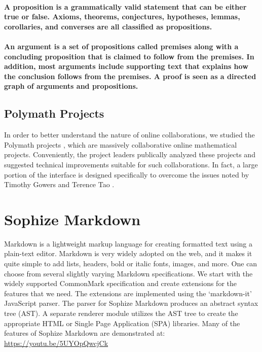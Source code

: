 \documentclass[a4paper]{article}
\begin{document}
\paragraph{A \textbf{proposition} is a grammatically valid statement that can be either true or false. Axioms, theorems, conjectures, hypotheses, lemmas, corollaries, and converses are all classified as propositions.}

\paragraph{An \textbf{argument} is a set of propositions called premises along with a concluding proposition that is claimed to follow from the premises. In addition, most arguments include supporting text that explains how the conclusion follows from the premises. A proof is seen as a directed graph of arguments and propositions.}

\subsection{Polymath Projects}
In order to better understand the nature of online collaborations, we studied the Polymath projects \cite{polymath_blog}, which are massively collaborative online mathematical projects. Conveniently, the project leaders publically analyzed these projects and suggested technical improvements suitable for such collaborations. In fact, a large portion of the interface is designed specifically to overcome the issues noted by Timothy Gowers \cite{gowers_weblog_2009} and Terence Tao \cite{whats_new_2009}.

\section{Sophize Markdown}

Markdown is a lightweight markup language for creating formatted text using a plain-text editor. Markdown is very widely adopted on the web, and it makes it quite simple to add lists, headers, bold or italic fonts, images, and more. One can choose from several slightly varying Markdown specifications. We start with the widely supported CommonMark specification and create extensions for the features that we need. The extensions are implemented using the `markdown-it' \cite{markdown_it} JavaScript parser. The parser for Sophize Markdown produces an abstract syntax tree (AST). A separate renderer module utilizes the AST tree to create the appropriate HTML or Single Page Application (SPA) libraries. Many of the features of Sophize Markdown are demonstrated at: \url{https://youtu.be/5UYOpQwcjCk}
\end{document}
